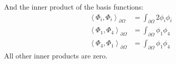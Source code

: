 \documentclass[reqno]{article}
\begin{document}
And the inner product of the basis functions:
\begin{equation}
\begin{split}
    \left<\Phi_i, \Phi_i\right>_{\partial \Omega}
    &=
    \int_{\partial \Omega} 2 \phi_i \phi_i \\
    \left<\Phi_1, \Phi_4\right>_{\partial \Omega}
    &=
    \int_{\partial \Omega} \phi_1 \phi_4 \\
    \left<\Phi_4, \Phi_1\right>_{\partial \Omega}
    &=
    \int_{\partial \Omega} \phi_1 \phi_4
\end{split}
\end{equation}
All other inner products are zero.
\end{document}
